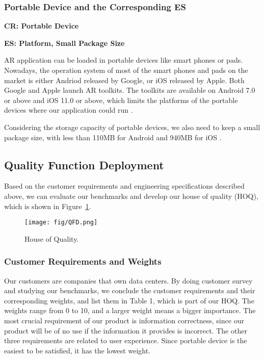 \documentclass[11pt,a4paper]{article}
\begin{document}
\begin{onehalfspace}
\subsubsection{Portable Device and the Corresponding ES}
\textbf{CR: Portable Device}

\textbf{ES: Platform, Small Package Size}

AR application can be loaded in portable devices like smart phones or pads. Nowadays, the operation system of most of the smart phones and pads on the market is either Andriod released by Google, or iOS released by Apple. Both Google and Apple launch AR toolkits. The toolkits are available on Android 7.0 or above and iOS 11.0 or above, which limits the platforms of the portable devices where our application could run \cite{ARkit}\cite{ARCore}. 

Considering the storage capacity of portable devices, we also need to keep a small package size, with less than 110MB for Android and 940MB for iOS \cite{AppStore}\cite{GooglePlay}.

\subsection{Quality Function Deployment}
\label{sec: quality}
Based on the customer requirements and engineering specifications described above, we can evaluate our benchmarks and develop our house of quality (HOQ), which is shown in Figure~\ref{fig:qfd}.

\begin{figure}[H]
    \centering
    \texttt{[image: fig/QFD.png]}
    \caption{House of Quality.}
    \label{fig:qfd}
\end{figure}

\subsubsection{Customer Requirements and Weights}

Our customers are companies that own data centers. By doing customer survey and studying our benchmarks, we conclude the customer requirements and their corresponding weights, and list them in Table 1, which is part of our HOQ. The weights range from 0 to 10, and a larger weight means a bigger importance. The most crucial requirement of our product is information correctness, since our product will be of no use if the information it provides is incorrect. The other three requirements are related to user experience. Since portable device is the easiest to be satisfied, it has the lowest weight.


\end{onehalfspace}
\end{document}
